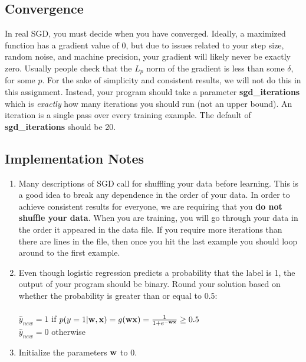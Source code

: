 \documentclass[11pt]{article}
\newcommand{\vw}{{\bf w}}
\newcommand{\vx}{{\bf x}}
\begin{document}
\subsection{Convergence}
In real SGD, you must decide when you have converged. Ideally, a maximized function has a gradient value of 0, but due to issues related to your step size, random noise, and machine precision, your gradient will likely never be exactly zero. Usually people check that the $L_p$ norm of the gradient is less than some $\delta$, for some $p$. For the sake of simplicity and consistent results, we will not do this in this assignment. Instead, your program should take a parameter \textbf{sgd\_iterations} which is \emph{exactly} how many iterations you should run (not an upper bound). An iteration is a single pass over every training example.
The default of \textbf{sgd\_iterations} should be 20.


\subsection{Implementation Notes}
\begin{enumerate}[1.]
\item Many descriptions of SGD call for shuffling your data before learning. This is a good idea to break any dependence in the order of your data. In order to achieve consistent results for everyone, we are requiring that you \textbf{do not shuffle your data}. When you are training, you will go through your data in the order it appeared in the data file. If you require more iterations than there are lines in the file, then once you hit the last example you should loop around to the first example.

\item
Even though logistic regression predicts a probability that the label is 1, the output of your program should be binary. Round your solution based on whether the probability is greater than or equal to 0.5:\\
\\
$\hat{y}_{new} = 1$ if $p(y = 1 | \vw, \vx) = g(\vw \vx) = \frac{1}{1 + e^{-\vw \vx}} \ge 0.5$\\
$\hat{y}_{new} = 0$ otherwise\\

\item
Initialize the parameters $\vw$ to $0$.

\end{enumerate}
\end{document}
